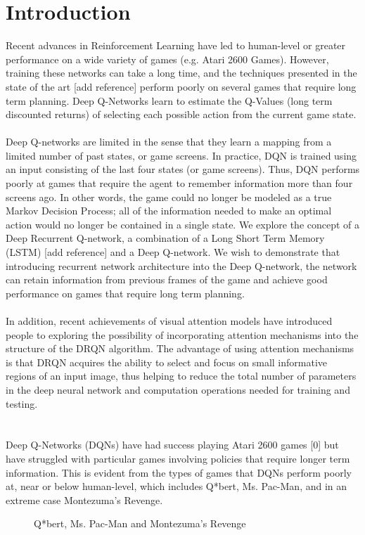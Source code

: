\documentclass{article}
\begin{document}
\section{Introduction}
    Recent advances in Reinforcement Learning have led to human-level or greater performance on a wide variety of games (e.g. Atari 2600 Games).  However, training these networks can take a long time, and the techniques presented in the state of the art [add reference] perform poorly on several games that require long term planning.  Deep Q-Networks learn to estimate the Q-Values (long term discounted returns) of selecting each possible action from the current game state.  \\
    \\
    Deep Q-networks are limited in the sense that they learn a mapping from a limited number of past states, or game screens.  In practice, DQN is trained using an input consisting of the last four states (or game screens).  Thus, DQN performs poorly at games that require the agent to remember information more than four screens ago.  In other words, the game could no longer be modeled as a true Markov Decision Process; all of the information needed to make an optimal action would no longer be contained in a single state.  We explore the concept of a Deep Recurrent Q-network, a combination of a Long Short Term Memory (LSTM) [add reference] and a Deep Q-network.  We wish to demonstrate that introducing recurrent network architecture into the Deep Q-network, the network can retain information from previous frames of the game and achieve good performance on games that require long term planning. \\
    \\
    In addition, recent achievements of visual attention models have introduced people to exploring the possibility of incorporating attention mechanisms into the structure of the DRQN algorithm.  The advantage of using attention mechanisms is that DRQN acquires the ability to select and focus on small informative regions of an input image, thus helping to reduce the total number of parameters in the deep neural network and computation operations needed for training and testing.  \\
    \\
    \\
    Deep Q-Networks (DQNs) have had success playing Atari 2600 games [0] but have 
    struggled with particular games involving policies that require longer term
    information. This is evident from the types of games that DQNs perform poorly at,
    near or below human-level, which includes Q*bert, Ms. Pac-Man, and in an extreme
    case Montezuma's Revenge.
    \begin{figure}[h]
        \centering
        \caption{Q*bert, Ms. Pac-Man and Montezuma's Revenge}
    \end{figure}
    
\end{document}
